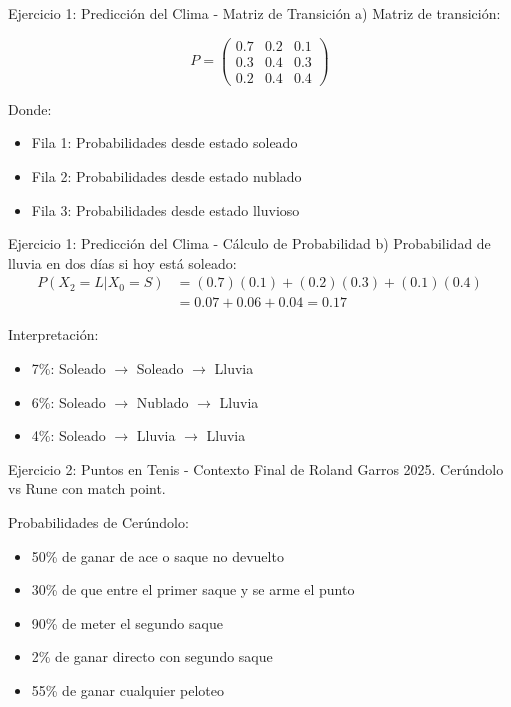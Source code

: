 \documentclass{beamer}
\begin{document}
\begin{frame}{Ejercicio 1: Predicción del Clima - Matriz de Transición}
    a) Matriz de transición:
    \begin{center}
        \[P = \begin{pmatrix}
        0.7 & 0.2 & 0.1 \\
        0.3 & 0.4 & 0.3 \\
        0.2 & 0.4 & 0.4
        \end{pmatrix}\]
    \end{center}
    
    Donde:
    \begin{itemize}
        \item Fila 1: Probabilidades desde estado soleado
        \item Fila 2: Probabilidades desde estado nublado
        \item Fila 3: Probabilidades desde estado lluvioso
    \end{itemize}
\end{frame}

\begin{frame}{Ejercicio 1: Predicción del Clima - Cálculo de Probabilidad}
    b) Probabilidad de lluvia en dos días si hoy está soleado:
    \[
    \begin{split}
    P(X_2 = L | X_0 = S) &= (0.7)(0.1) + (0.2)(0.3) + (0.1)(0.4) \\
    &= 0.07 + 0.06 + 0.04 = 0.17
    \end{split}
    \]
    
    Interpretación:
    \begin{itemize}
        \item 7\%: Soleado $\rightarrow$ Soleado $\rightarrow$ Lluvia
        \item 6\%: Soleado $\rightarrow$ Nublado $\rightarrow$ Lluvia
        \item 4\%: Soleado $\rightarrow$ Lluvia $\rightarrow$ Lluvia
    \end{itemize}
\end{frame}

\begin{frame}{Ejercicio 2: Puntos en Tenis - Contexto}
    Final de Roland Garros 2025. Cerúndolo vs Rune con match point.
    
    Probabilidades de Cerúndolo:
    \begin{itemize}
        \item 50\% de ganar de ace o saque no devuelto
        \item 30\% de que entre el primer saque y se arme el punto
        \item 90\% de meter el segundo saque
        \item 2\% de ganar directo con segundo saque
        \item 55\% de ganar cualquier peloteo
    \end{itemize}
\end{frame}
\end{document}
